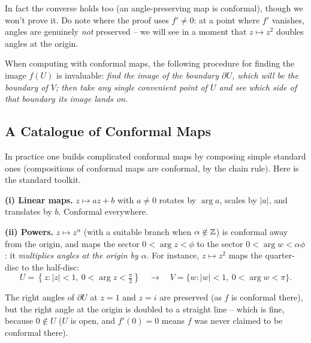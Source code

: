\documentclass[a4paper]{scrartcl}
\begin{document}
In fact the converse holds too (an angle-preserving map is conformal), though we won't prove it. Do note where the proof uses $f' \neq 0$: at a point where $f'$ vanishes, angles are genuinely \emph{not} preserved -- we will see in a moment that $z \mapsto z^2$ doubles angles at the origin.

When computing with conformal maps, the following procedure for finding the image $f(U)$ is invaluable: \emph{find the image of the boundary $\partial U$, which will be the boundary of $V$; then take any single convenient point of $U$ and see which side of that boundary its image lands on.}

\subsection{A Catalogue of Conformal Maps}

In practice one builds complicated conformal maps by composing simple standard ones (compositions of conformal maps are conformal, by the chain rule). Here is the standard toolkit.

\textbf{(i) Linear maps.} $z \mapsto az + b$ with $a \neq 0$ rotates by $\arg a$, scales by $|a|$, and translates by $b$. Conformal everywhere.

\textbf{(ii) Powers.} $z \mapsto z^\alpha$ (with a suitable branch when $\alpha \notin \mathbb{Z}$) is conformal away from the origin, and maps the sector $0 < \arg z < \phi$ to the sector $0 < \arg w < \alpha\phi$: it \emph{multiplies angles at the origin by $\alpha$}. For instance, $z \mapsto z^2$ maps the quarter-disc to the half-disc:
$$
U = \left\{z : |z| < 1, \ 0 < \arg z < \tfrac{\pi}{2}\right\} \quad \longrightarrow \quad V = \{w : |w| < 1, \ 0 < \arg w < \pi\}.
$$
\begin{center}
\end{center}
The right angles of $\partial U$ at $z = 1$ and $z = i$ are preserved (as $f$ is conformal there), but the right angle at the origin is doubled to a straight line -- which is fine, because $0 \notin U$ ($U$ is open, and $f'(0) = 0$ means $f$ was never claimed to be conformal there).
\end{document}
